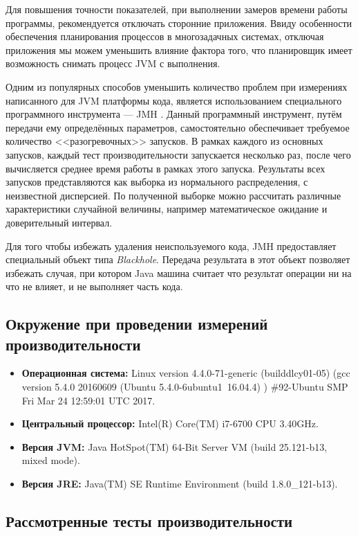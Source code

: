 Для повышения точности показателей, при выполнении замеров времени работы программы, рекомендуется отключать сторонние приложения. Ввиду особенности обеспечения планирования процессов в многозадачных системах, отключая приложения мы можем уменьшить влияние фактора того, что планировщик имеет возможность снимать процесс JVM с выполнения.

Одним из популярных способов уменьшить количество проблем при измерениях написанного для JVM платформы кода, является использованием специального программного инструмента --- JMH \cite{java:jmh}. Данный программный инструмент, путём передачи ему определённых параметров, самостоятельно обеспечивает требуемое количество <<разогревочных>> запусков. В рамках каждого из основных запусков, каждый тест производительности запускается несколько раз, после чего вычисляется среднее время работы в рамках этого запуска. Результаты всех запусков представляются как выборка из нормального распределения, с неизвестной дисперсией. По полученной выборке можно рассчитать различные характеристики случайной величины, например математическое ожидание и доверительный интервал.

    Для того чтобы избежать удаления неиспользуемого кода, JMH предоставляет специальный объект типа \textit{Blackhole}. Передача результата в этот объект позволяет избежать случая, при котором Java машина считает что результат операции ни на что не влияет, и не выполняет часть кода.

\subsection{Окружение при проведении измерений производительности}

\begin{itemize}
    \item \textbf{Операционная система:} Linux version 4.4.0-71-generic (buildd\at lcy01-05) (gcc version 5.4.0 20160609 (Ubuntu 5.4.0-6ubuntu1~16.04.4) ) \#92-Ubuntu SMP Fri Mar 24 12:59:01 UTC 2017.
    \item \textbf{Центральный процессор:}  Intel(R) Core(TM) i7-6700 CPU \at 3.40GHz.
    \item \textbf{Версия JVM:}  Java HotSpot(TM) 64-Bit Server VM (build 25.121-b13, mixed mode).
    \item \textbf{Версия JRE:}  Java(TM) SE Runtime Environment (build 1.8.0\_121-b13).
\end{itemize}


\subsection{Рассмотренные тесты производительности}


